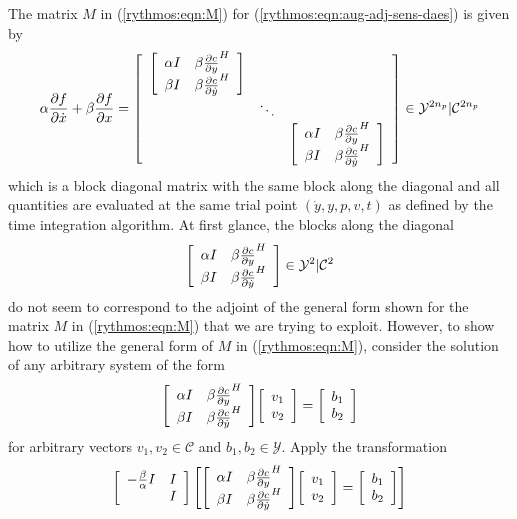 \documentclass[pdf,ps2pdf,11pt]{SANDreport}
\begin{document}
The matrix $M$ in (\ref{rythmos:eqn:M}) for
(\ref{rythmos:eqn:aug-adj-sens-daes}) is given by
%
\begin{equation}
\alpha \frac{\partial f}{\partial \dot{x}} + \beta \frac{\partial f}{\partial x}
= 
{\bmat{ccc}
%
{\bmat{cc}
\alpha I & \beta \frac{\partial c}{\partial y}^H \\
\beta I &  \beta \frac{\partial c}{\partial \dot{y}}^H
\emat} \\
%
& \ddots \\
%
& & {\bmat{cc}
\alpha I & \beta \frac{\partial c}{\partial y}^H \\
\beta I &  \beta \frac{\partial c}{\partial \dot{y}}^H
\emat}
%
\emat}
\in \mathcal{Y}^{2 n_p}|\mathcal{C}^{2 n_p}
\label{rythmos:eqn:aug-adj-sens-daes-jac}
\end{equation}
%
which is a block diagonal matrix with the same block along the diagonal and
all quantities are evaluated at the same trial point $(\dot{y},y,p,v,t)$ as
defined by the time integration algorithm.  At first glance, the blocks along
the diagonal
%
\begin{equation}
{\bmat{cc}
\alpha I & \beta \frac{\partial c}{\partial y}^H \\
\beta I &  \beta \frac{\partial c}{\partial \dot{y}}^H
\emat} \in \mathcal{Y}^{2}|\mathcal{C}^{2}
\label{rythmos:eqn:aug-adj-sens-jac}
\end{equation}
%
do not seem to correspond to the adjoint of the general form shown for the
matrix $M$ in (\ref{rythmos:eqn:M}) that we are trying to exploit.  However,
to show how to utilize the general form of $M$ in (\ref{rythmos:eqn:M}),
consider the solution of any arbitrary system of the form
%
\begin{equation}
{\bmat{cc}
\alpha I & \beta \frac{\partial c}{\partial y}^H \\
\beta I &  \beta \frac{\partial c}{\partial \dot{y}}^H
\emat}
{\bmat{c} v_1 \\ v_2 \emat}
=
{\bmat{c} b_1 \\ b_2 \emat}
\label{rythmos:eqn:aug-adj-sens-system}
\end{equation}
%
for arbitrary vectors $v_1, v_2 {}\in\mathcal{C}$ and $b_1, b_2
{}\in\mathcal{Y}$.  Apply the transformation
%
\[
{\bmat{cc}
-\frac{\beta}{\alpha} I & I \\
 & I
\emat}
\left[
{\bmat{cc}
\alpha I & \beta \frac{\partial c}{\partial y}^H \\
\beta I &  \beta \frac{\partial c}{\partial \dot{y}}^H
\emat}
{\bmat{c} v_1 \\ v_2 \emat}
=
{\bmat{c} b_1 \\ b_2 \emat}
\right]
\]
\end{document}
